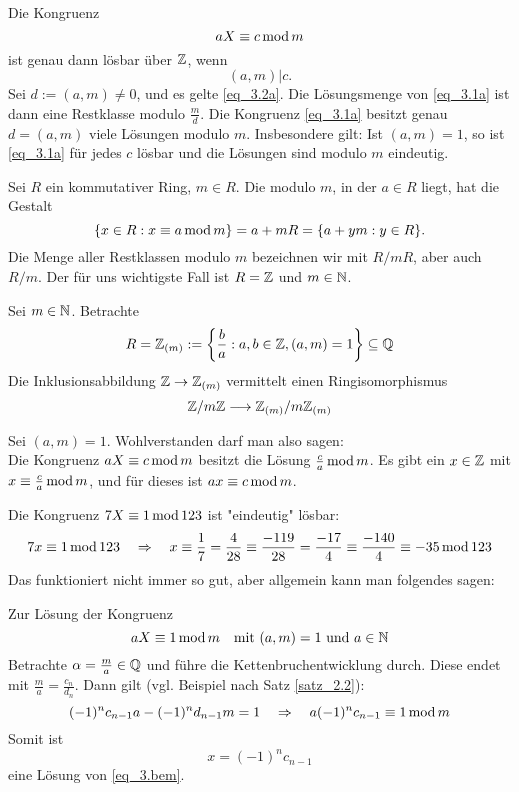 \begin{falko} \label{F3.5}
	Die Kongruenz
	\begin{equation}
		aX \kon c \modu m \label{eq_3.1a}
	\end{equation}
	ist genau dann lösbar über $\ZZ$, wenn
	\begin{equation}
		(a,m) | c. \label{eq_3.2a}
	\end{equation}
	Sei $d := (a,m) \neq 0$, und es gelte \eqref{eq_3.2a}. Die Lösungsmenge von \eqref{eq_3.1a} ist dann eine Restklasse modulo $\frac{m}{d}$. Die Kongruenz \eqref{eq_3.1a} besitzt genau $d = (a,m)$ viele Lösungen modulo $m$. Insbesondere gilt: Ist $(a,m) = 1$, so ist \eqref{eq_3.1a} für jedes $c$ lösbar und die Lösungen sind modulo $m$ eindeutig. 
\end{falko}

\setcounter{countdef}{1}
\begin{defn} \label{def_3.2a}
	Sei $R$ ein kommutativer Ring, $m \in R$. Die  modulo $m$, in der $a \in R$ liegt, hat die Gestalt
	\[ \{x \in R : x \kon a \modu m\} = a+mR = \{a + ym : y \in R\}. \]
	Die Menge aller Restklassen modulo $m$ bezeichnen wir mit $R/mR$, aber auch $R/m$. Der für uns wichtigste Fall ist $R = \ZZ$ und $m \in \NN$.
\end{defn}

	Sei $m \in \NN$. Betrachte
	\[R = \ZZ_{(m)} := \penbrace*{ \frac{b}{a} : a,b \in \ZZ, (a,m) = 1} \subseteq \QQ \]
	Die Inklusionsabbildung $\ZZ \rightarrow \ZZ_{(m)}$ vermittelt einen Ringisomorphismus
	\begin{equation}
		\ZZ/m\ZZ \longrightarrow \ZZ_{(m)}/m\ZZ_{(m)}
	\end{equation}
	
	Sei $(a,m) = 1$. Wohlverstanden darf man also sagen: \\
	Die Kongruenz $aX \kon c \modu m$ besitzt die Lösung $\frac{c}{a} \modu m$. Es gibt ein $x \in \ZZ$ mit $x \kon \frac{c}{a} \modu m$, und für dieses ist $ax \kon c \modu m$.
	
	Die Kongruenz $7X \kon 1 \modu 123$ ist "eindeutig" lösbar:
	\[ 7x \kon 1 \modu 123 \quad \Rightarrow \quad x \kon \frac{1}{7} = \frac{4}{28} \kon \frac{-119}{28} = \frac{-17}{4} \kon \frac{-140}{4} \kon -35 \modu 123 \]
	Das funktioniert nicht immer so gut, aber allgemein kann man folgendes sagen:
	
	Zur Lösung der Kongruenz
	\begin{equation}
		aX \kon 1 \modu m \quad \text{mit } (a,m) = 1 \text{ und } a \in \NN \label{eq_3.bem}
	\end{equation}
	Betrachte $\alpha = \frac{m}{a} \in \QQ$ und führe die Kettenbruchentwicklung durch. Diese endet mit $\frac{m}{a} = \frac{c_n}{d_n}$. Dann gilt (vgl. Beispiel nach Satz \ref{satz_2.2}):
	\[ (-1)^n c_{n-1}a - (-1)^n d_{n-1} m = 1 \quad \Rightarrow \quad a(-1)^n c_{n-1} \kon 1 \modu m \]
	Somit ist
	\[ x = (-1)^n c_{n-1} \]
	eine Lösung von \eqref{eq_3.bem}.
	
